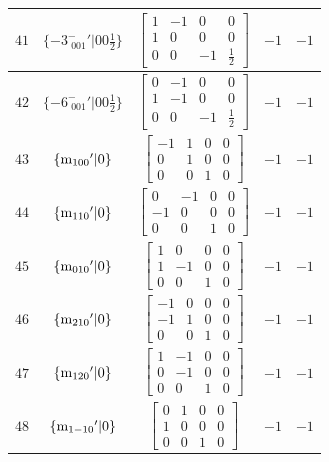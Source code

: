 \documentclass[fleqn,8pt]{jsarticle}
\begin{document}
\begin{longtable}{ccccc}
$ 41 $ & $ \{-3^{-}_{\,\,001}{}'|0 0 \frac{1}{2}\} $ & $ \begin{bmatrix} 1 & -1 & 0 & 0 \\ 1 & 0 & 0 & 0 \\ 0 & 0 & -1 & \frac{1}{2} \end{bmatrix} $ & $ -1 $ & $ -1 $ \\ \hline
$ 42 $ & $ \{-6^{-}_{\,\,001}{}'|0 0 \frac{1}{2}\} $ & $ \begin{bmatrix} 0 & -1 & 0 & 0 \\ 1 & -1 & 0 & 0 \\ 0 & 0 & -1 & \frac{1}{2} \end{bmatrix} $ & $ -1 $ & $ -1 $ \\ \hline
$ 43 $ & $ \{{\rm m}_{100}{}'|0\} $ & $ \begin{bmatrix} -1 & 1 & 0 & 0 \\ 0 & 1 & 0 & 0 \\ 0 & 0 & 1 & 0 \end{bmatrix} $ & $ -1 $ & $ -1 $ \\ \hline
$ 44 $ & $ \{{\rm m}_{110}{}'|0\} $ & $ \begin{bmatrix} 0 & -1 & 0 & 0 \\ -1 & 0 & 0 & 0 \\ 0 & 0 & 1 & 0 \end{bmatrix} $ & $ -1 $ & $ -1 $ \\ \hline
$ 45 $ & $ \{{\rm m}_{010}{}'|0\} $ & $ \begin{bmatrix} 1 & 0 & 0 & 0 \\ 1 & -1 & 0 & 0 \\ 0 & 0 & 1 & 0 \end{bmatrix} $ & $ -1 $ & $ -1 $ \\ \hline
$ 46 $ & $ \{{\rm m}_{210}{}'|0\} $ & $ \begin{bmatrix} -1 & 0 & 0 & 0 \\ -1 & 1 & 0 & 0 \\ 0 & 0 & 1 & 0 \end{bmatrix} $ & $ -1 $ & $ -1 $ \\ \hline
$ 47 $ & $ \{{\rm m}_{120}{}'|0\} $ & $ \begin{bmatrix} 1 & -1 & 0 & 0 \\ 0 & -1 & 0 & 0 \\ 0 & 0 & 1 & 0 \end{bmatrix} $ & $ -1 $ & $ -1 $ \\ \hline
$ 48 $ & $ \{{\rm m}_{1-10}{}'|0\} $ & $ \begin{bmatrix} 0 & 1 & 0 & 0 \\ 1 & 0 & 0 & 0 \\ 0 & 0 & 1 & 0 \end{bmatrix} $ & $ -1 $ & $ -1 $ \\
\end{longtable}
\end{document}
